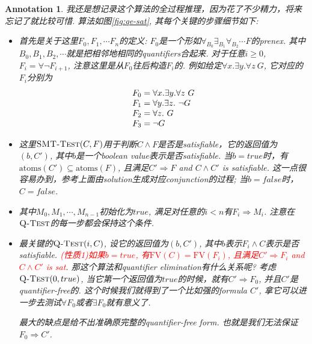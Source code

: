 \documentclass{article}
\newtheorem{annotation}[theorem]{Annotation}
\newcommand{\redt}[1]{\textcolor{red}{#1}}
\begin{document}
\begin{annotation}
我还是想记录这个算法的全过程推理，因为花了不少精力，将来忘记了就比较可惜. 算法如图\ref{fig:qe-sat}, 其每个关键的步骤细节如下:
\begin{itemize}
    \item 首先是关于这里$F_0, F_1, \cdots F_n$的定义: $F_0$是一个形如$\forall_{B_0}\exists_{B_1}\forall_{B_2}\cdots F$的prenex. 其中$B_0,B_1,B_2,\cdots$就是把相邻地相同的quantifiers合起来. 对于任意$i \geq 0$, $F_i = \forall \neg F_{i+1}$, 注意这里是从$F_0$往后构造$F_i$的. 例如给定$\forall x. \exists y.\forall z~G$, 它对应的$F_i$分别为
    \[
        \begin{tabular}{l}
        $F_0 = \forall x. \exists y.\forall z~G$ \\
        $F_1 = \forall y. \exists z.~\neg G$ \\
        $F_2 = \forall z.~G$ \\
        $F_3 = \neg G$
        \end{tabular}
    \]
    \item 这里$\textsc{SMT-Test}(C, F)$用于判断$C \wedge F$是否是satisfiable，它的返回值为$(b, C')$, 其中$b$是一个boolean value表示是否satisfiable. 当$b = true$时，有$\text{atoms}(C') \subseteq \text{atoms}(F)$, 且满足$C' \Rightarrow F$ and $C \wedge C'$ is satisfiable. 这一点很容易办到，参考上面由solution生成对应conjunction的过程; 当$b=false$时，$C = false$.
    \item 其中$M_0,M_1,\cdots,M_{n-1}$初始化为$true$, 满足对任意的$i < n$有$F_i \Rightarrow M_i$. 注意在$\textsc{Q-Test}$的每一步都会保持这个条件.
    \item 最关键的$\textsc{Q-Test}(i, C)$, 设它的返回值为$(b, C')$, 其中$b$表示$F_i \wedge C$表示是否satisfiable. \redt{(性质1)如果$b = true$, 有$\text{FV}(C) = \text{FV}(F_i)$, 且满足$C' \Rightarrow F_i$ and $C \wedge C'$ is sat}. 那这个算法和quantifier elimination有什么关系呢? 考虑$\textsc{Q-Test}(0, true)$, 当它第一个返回值为$true$的时候，就有$C' \Rightarrow F_0$, 并且$C'$是quantifier-free的. 这个时候我们就得到了一个比如强的formula $C'$, 拿它可以进一步去测试$\forall F_0$或者$\exists F_0$就有意义了.  
    
    最大的缺点是给不出准确原完整的quantifier-free form. 也就是我们无法保证$F_0 \Rightarrow C'$.
    
    

\end{itemize}
\end{annotation}
\end{document}
